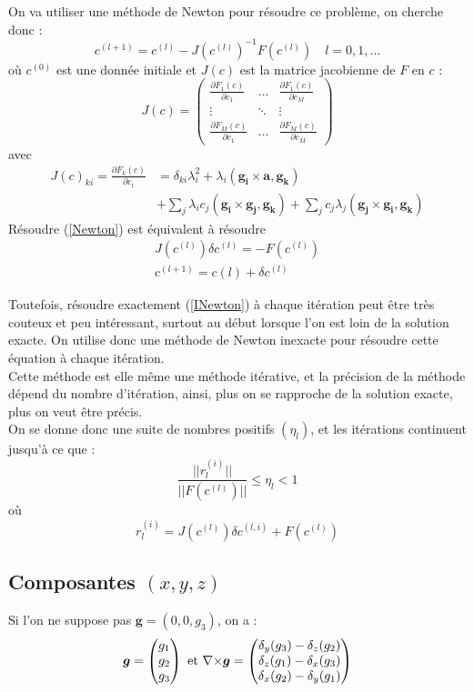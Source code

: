 On va utiliser une méthode de Newton pour résoudre ce problème, on cherche donc :
\begin{equation}
\label{Newton}
c^{(l+1)} = c^{(l)} - J(c^{(l)})^{-1}F(c^{(l)})\quad l=0,1,\ldots
\end{equation}
où $c^{(0)}$ est une donnée initiale et $J(c)$ est la matrice jacobienne de $F$ en $c$ :
\[
J(c)=
\begin{pmatrix}
\frac{\partial F_1(c)}{\partial c_1} & \ldots & \frac{\partial F_1(c)}{\partial c_M}\\
\vdots & \ddots & \vdots\\
\frac{\partial F_M(c)}{\partial c_1} & \ldots & \frac{\partial F_M(c)}{\partial c_M}
\end{pmatrix}
\]
avec 
\begin{align*}
J(c)_{ki} = \frac{\partial F_k(c)}{\partial c_i} &= \delta_{ki}\lambda_i^2 + \lambda_i(\mathbf{g_i}\times \mathbf{a},\mathbf{g_k})\\
&+ \sum_j\lambda_i c_j (\mathbf{g_i}\times\mathbf{g_j},\mathbf{g_k}) + \sum_j c_j\lambda_j (\mathbf{g_j}\times\mathbf{g_i},\mathbf{g_k})
\end{align*}
Résoudre (\ref{Newton}) est équivalent à résoudre 
\begin{equation}
\label{INewton}
\begin{aligned}
J(c^{(l)})\delta c^{(l)} = -F(c^{(l)})\\
c^{(l+1)}=c{(l)}+\delta c^{(l)}
\end{aligned}
\end{equation}

Toutefois, résoudre exactement (\ref{INewton}) à chaque itération peut être très couteux et peu intéressant, surtout au début lorsque l'on est loin de la solution exacte. On utilise donc une méthode de Newton inexacte pour résoudre cette équation à chaque itération.\\
Cette méthode est elle même une méthode itérative, et la précision de la méthode dépend du nombre d'itération, ainsi, plus on se rapproche de la solution exacte, plus on veut être précis.
\\On se donne donc une suite de nombres positifs $(\eta_l)$, et les itérations continuent jusqu'à ce que :
\[
\frac{||r_l^{(i)}||}{||F(c^{(l)})||} \leq \eta_l<1
\]
où
\[
r_l^{(i)} = J(c^{(l)})\delta c^{(l,i)} + F(c^{(l)})
\]

\iffalse

\subsection{Composantes $(x,y,z)$}
Si l'on ne suppose pas $\bm{g}=(0,0,g_3)$, on a : 
\[
\bm{g}=
\begin{pmatrix}
g_1\\
g_2\\
g_3
\end{pmatrix}
\text{ et }
{\nabla\times}\bm{g}=
\begin{pmatrix}
\delta_y(g_3)-\delta_z(g_2)\\
\delta_z(g_1)-\delta_x(g_3)\\
\delta_x(g_2)-\delta_y(g_1)
\end{pmatrix}
\]

